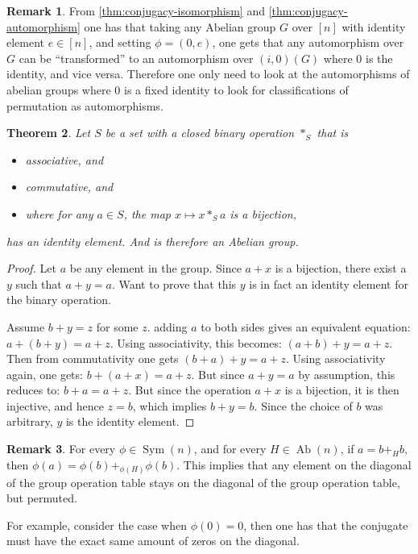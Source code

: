 \documentclass[a4paper, 12pt, english]{article}
\theoremstyle{plain}
\newtheorem{theorem}{Theorem}[section]
\theoremstyle{definition}
\newtheorem{remark}[theorem]{Remark}
\DeclareMathOperator{\Ab}{Ab}
\DeclareMathOperator{\Sym}{Sym}
\begin{document}
\begin{remark}
    From \autoref{thm:conjugacy-isomorphism} and \autoref{thm:conjugacy-automorphism} one has that taking any Abelian group \( G \) over \( [n] \) with identity element \( e \in [n] \), and setting \( \phi = (0, e) \), one gets that any automorphism over \( G \) can be ``transformed'' to an automorphism over \( (i, 0)(G) \) where \( 0 \) is the identity, and vice versa. Therefore one only need to look at the automorphisms of abelian groups where \( 0 \) is a fixed identity to look for classifications of permutation as automorphisms.
\end{remark}

\begin{theorem}
    Let \( S \) be a set with a closed binary operation \( *_S \) that is
    \begin{itemize}
        \item associative, and
        \item commutative, and
        \item where for any \( a \in S \), the map \( x \mapsto x *_S a \) is a bijection,
    \end{itemize}
    has an identity element. And is therefore an Abelian group.
\end{theorem}
\begin{proof}
    Let \( a \) be any element in the group. Since \( a + x \) is a bijection, there exist a \( y \) such that \( a + y = a \). Want to prove that this \( y \) is in fact an identity element for the binary operation.

    Assume \( b + y = z\) for some \( z \). adding \( a \) to both sides gives an equivalent equation: \( a + (b + y) = a + z \). Using associativity, this becomes: \( (a + b) + y = a + z \). Then from commutativity one gets \( (b + a) + y = a + z \). Using associativity again, one gets: \( b + (a + x) = a + z\). But since \( a + y = a \) by assumption, this reduces to: \( b + a = a + z \). But since the operation \( a + x\) is a bijection, it is then injective, and hence \( z = b \), which implies \( b + y = b\). Since the choice of \( b \) was arbitrary, \( y \) is the identity element.
\end{proof}

\begin{remark}
    For every \( \phi \in \Sym(n) \), and for every \( H \in \Ab(n) \), if \( a = b +_H b \), then \( \phi(a) = \phi(b) +_{\phi(H)} \phi(b) \). This implies that any element on the diagonal of the group operation table stays on the diagonal of the group operation table, but permuted.

    For example, consider the case when \( \phi(0) = 0 \), then one has that the conjugate must have the exact same amount of zeros on the diagonal.
\end{remark}
\end{document}
